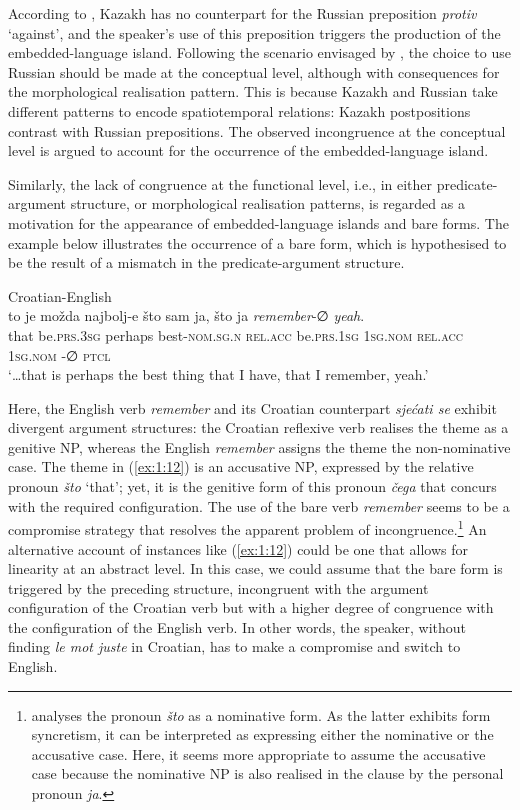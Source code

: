 \noindent According to \citet{muhamedowa-untersuchung-2006}, Kazakh has no counterpart for the Russian preposition \textit{protiv} `against', and the speaker's use of this preposition triggers the production of the embedded-language island. Following the scenario envisaged by \citet[995]{myers-scotton-matching-1995}, the choice to use Russian should be made at the conceptual level, although with consequences for the morphological realisation pattern. This is because Kazakh and Russian take different patterns to encode spatiotemporal relations: Kazakh postpositions contrast with Russian prepositions. The observed incongruence at the conceptual level is argued to account for the occurrence of the embedded-language island.

Similarly, the lack of congruence at the functional level, i.e., in either predicate-argument structure, or morphological realisation patterns, is regarded as a motivation for the appearance of embedded-language islands and bare forms. The example below illustrates the occurrence of a bare form, which is hypothesised to be the result of a mismatch in the predicate-argument structure.

\ea{\label{ex:1:12}}
Croatian-English \citep[213]{hlavac-second-generation-2003}\\
\gll {\dots} to je možda najbolj-e što sam ja, što ja \textit{remember}-∅ \textit{yeah}.\\
	{} that be.\textsc{prs.3sg} perhaps best-\textsc{nom.sg.n} \textsc{rel.acc} be.\textsc{prs.1sg} \textsc{1sg.nom} \textsc{rel.acc} \textsc{1sg.nom} \phantom{remember}-∅ \textsc{ptcl}\\
\glt `\dots that is perhaps the best thing that I have, that I remember, yeah.'
\z

\noindent Here, the English verb \textit{remember} and its Croatian counterpart \textit{sjećati se} exhibit divergent argument structures: the Croatian reflexive verb realises the theme as a genitive NP, whereas the English \textit{remember} assigns the theme the non-nominative case. The theme in (\ref{ex:1:12}) is an accusative NP, expressed by the relative pronoun \textit{što} `that'; yet, it is the genitive form of this pronoun \textit{čega} that concurs with the required configuration. The use of the bare verb \textit{remember} seems to be a compromise strategy that resolves the apparent problem of incongruence.\footnote{\citet[213]{hlavac-second-generation-2003} analyses the pronoun \textit{što} as a nominative form. As the latter exhibits form syncretism, it can be interpreted as expressing either the nominative or the accusative case. Here, it seems more appropriate to assume the accusative case because the nominative NP is also realised in the clause by the personal pronoun \textit{ja}.}
An alternative account of instances like (\ref{ex:1:12}) could be one that allows for linearity at an abstract level. In this case, we could assume that the bare form is triggered by the preceding structure, incongruent with the argument configuration of the Croatian verb but with a higher degree of congruence with the configuration of the English verb. In other words, the speaker, without finding \textit{le mot juste} in Croatian, has to make a compromise and switch to English.

